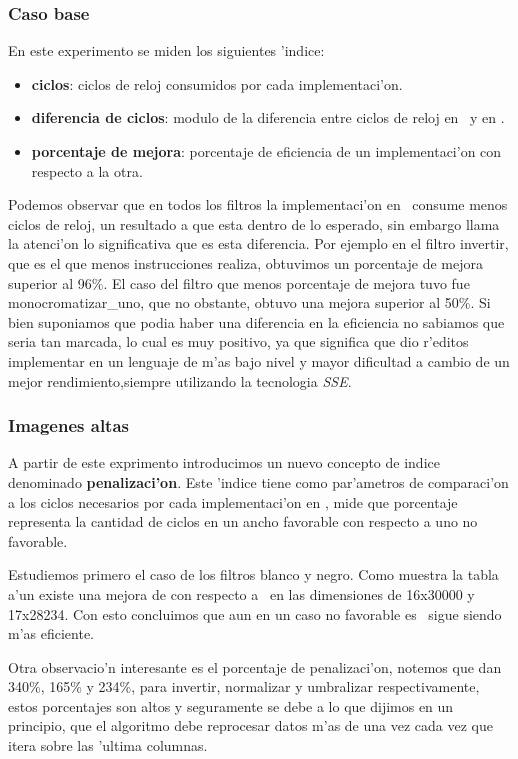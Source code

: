 \subsubsection{Caso base}
En este experimento se miden los siguientes 'indice:
\begin{itemize}
 \item{} \textbf{ciclos}: ciclos de reloj consumidos por cada implementaci'on.
 \item{} \textbf{diferencia de ciclos}: modulo de la diferencia entre ciclos de reloj en \C \ y en \ass.
 \item{} \textbf{porcentaje de mejora}: porcentaje de eficiencia de un implementaci'on con respecto a la otra.
\end{itemize}

Podemos observar que en todos los filtros 
la implementaci'on en \ass \ consume
menos ciclos de reloj, un resultado a que esta dentro de lo esperado, sin embargo llama la atenci'on
lo significativa que es esta diferencia. Por ejemplo en el filtro invertir, que es el que menos instrucciones
realiza, obtuvimos un porcentaje de mejora superior al 96$\%$. El caso del filtro que menos porcentaje
de mejora tuvo fue monocromatizar_uno, que no obstante, obtuvo una mejora superior al 50$\%$. Si bien
suponiamos que podia haber una diferencia en la eficiencia no sabiamos que seria tan marcada, lo cual es muy 
positivo, ya que significa que dio r'editos implementar en un lenguaje de m'as bajo nivel y mayor dificultad
 a cambio de un mejor rendimiento,siempre utilizando la tecnologia \textit{SSE}.\\

\subsubsection{Imagenes altas}
A partir de este exprimento introducimos un nuevo concepto de indice denominado
\textbf{penalizaci'on}. Este 'indice tiene como par'ametros de comparaci'on a los ciclos necesarios por
cada implementaci'on en \ass, mide que porcentaje representa la cantidad de ciclos en un ancho 
favorable con respecto a uno no favorable.

Estudiemos primero el caso de los filtros blanco y negro. Como muestra la tabla a'un existe una 
mejora de \ass  con respecto a \C \  en las dimensiones de 16x30000 y 17x28234. Con esto concluimos que aun
en un caso no favorable es \ass \ sigue siendo m'as eficiente.

Otra observacio'n interesante es el porcentaje de penalizaci'on, notemos que dan 340\%, 165\% y
234\%, para invertir, normalizar y umbralizar respectivamente, estos porcentajes son altos 
y seguramente se debe a lo que dijimos en un principio, que el algoritmo debe reprocesar datos m'as de 
una vez cada vez que itera sobre las 'ultima columnas.

